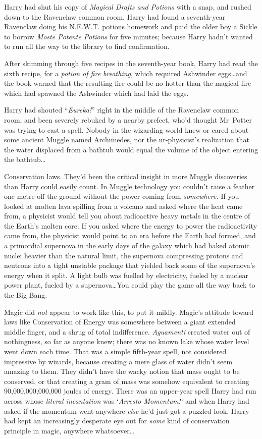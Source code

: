 Harry had shut his copy of \emph{Magical Drafts and Potions} with a snap, and
rushed down to the Ravenclaw common room. Harry had found a seventh-year
Ravenclaw doing his N.E.W.T. potions homework and paid the older boy a Sickle
to borrow \emph{Moste Potente Potions} for five minutes; because Harry hadn’t
wanted to run all the way to the library to find confirmation.

After skimming through five recipes in the seventh-year book, Harry had read
the sixth recipe, for a \emph{potion of fire breathing}, which required
Ashwinder eggs…and the book warned that the resulting fire could be no
hotter than the magical fire which had spawned the Ashwinder which had laid the
eggs.

Harry had shouted “\emph{Eureka!}” right in the middle of the Ravenclaw common
room, and been severely rebuked by a nearby prefect, who’d thought Mr~Potter
was trying to cast a spell. Nobody in the wizarding world knew or cared about
some ancient Muggle named Archimedes, nor the ur-physicist’s realization that
the water displaced from a bathtub would equal the volume of the object
entering the bathtub…

Conservation laws. They’d been the critical insight in more Muggle discoveries
than Harry could easily count. In Muggle technology you couldn’t raise a
feather one metre off the ground without the power coming from
\emph{somewhere.} If you looked at molten lava spilling from a volcano and
asked where the heat came from, a physicist would tell you about radioactive
heavy metals in the centre of the Earth’s molten core. If you asked where the
energy to power the radioactivity came from, the physicist would point to an
era before the Earth had formed, and a primordial supernova in the early days
of the galaxy which had baked atomic nuclei heavier than the natural limit, the
supernova compressing protons and neutrons into a tight unstable package that
yielded back some of the supernova’s energy when it split. A light bulb was
fuelled by electricity, fueled by a nuclear power plant, fueled by a
supernova…You could play the game all the way back to the Big Bang.

Magic did \emph{not} appear to work like this, to put it mildly. Magic’s
attitude toward laws like Conservation of Energy was somewhere between a giant
extended middle finger, and a shrug of total indifference. \emph{Aguamenti}
created water out of nothingness, so far as anyone knew; there was no known
lake whose water level went down each time. That was a simple fifth-year spell,
not considered impressive by wizards, because creating a mere glass of water
didn’t seem amazing to them. They didn’t have the wacky notion that mass ought
to be conserved, or that creating a gram of mass was somehow equivalent to
creating 90,000,000,000,000 joules of energy. There was an upper-year spell
Harry had run across whose \emph{literal incantation} was ‘\emph{Arresto
Momentum!’} and when Harry had asked if the momentum went anywhere \emph{else}
he’d just got a puzzled look. Harry had kept an increasingly desperate eye
out for \emph{some} kind of conservation principle in magic, anywhere
whatsoever…

